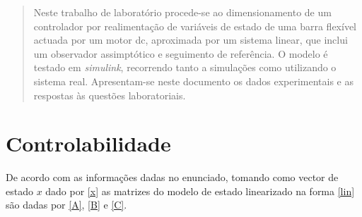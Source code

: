 \documentclass[%
  reprint,
  nofootinbib,
  amsmath,amssymb,
  aps,
  10pt,
  a4paper
]{revtex4-1}
\begin{document}
\begin{abstract}
Neste trabalho de laboratório procede-se ao dimensionamento de um controlador por realimentação de variáveis de estado de uma barra flexível actuada por um motor dc, aproximada por um sistema linear, que inclui um observador assimptótico e seguimento de referência.
O modelo é testado em {\it simulink}, recorrendo tanto a simulações como utilizando o sistema real.
Apresentam-se neste documento os dados experimentais e as respostas às questões laboratoriais.
\end{abstract}
\maketitle


\section{Controlabilidade}

De acordo com as informações dadas no enunciado, tomando como vector de estado $x$ dado por \eqref{x} as matrizes do modelo de estado linearizado na forma \eqref{lin} são dadas por \eqref{A}, \eqref{B} e \eqref{C}.






\end{document}

